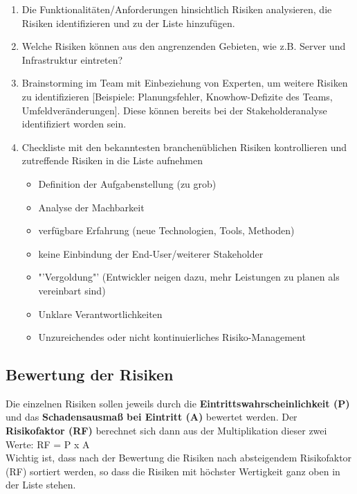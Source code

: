 \documentclass[
	headings=optiontotocandhead,%
	oneside,
	numbers=noenddot,%
	toc=flat, %
	10pt, %
	parskip=full, %
	listof=totoc, %
	listof=flat, %
	numbers=noenddot, %
	bibliography=totoc, %
	a4paper,DIV=14,
]{scrartcl}
\begin{document}
\begin{enumerate}
	\item{Die Funktionalitäten/Anforderungen hinsichtlich Risiken analysieren, die Risiken identifizieren und zu der Liste hinzufügen.}
	\item{Welche Risiken können aus den angrenzenden Gebieten, wie z.B. Server und Infrastruktur eintreten?}
	\item{Brainstorming im Team mit Einbeziehung von Experten, um weitere Risiken zu identifizieren [Beispiele: Planungsfehler, Knowhow-Defizite des Teams, Umfeldveränderungen]. Diese können bereits bei der Stakeholderanalyse identifiziert worden sein.}
	\item{
		Checkliste mit den bekanntesten branchenüblichen Risiken kontrollieren und zutreffende Risiken in die Liste aufnehmen
		\begin{itemize}
			\item Definition der Aufgabenstellung (zu grob)
			\item Analyse der Machbarkeit
			\item verfügbare Erfahrung (neue Technologien, Tools, Methoden)
			\item keine Einbindung der End-User/weiterer Stakeholder
			\item "'Vergoldung"' (Entwickler neigen dazu, mehr Leistungen zu planen als vereinbart sind)
			\item Unklare Verantwortlichkeiten
			\item Unzureichendes oder nicht kontinuierliches Risiko-Management
		\end{itemize}
		}
\end{enumerate}

\subsection{Bewertung der Risiken}
Die einzelnen Risiken sollen jeweils durch die \textbf{Eintrittswahrscheinlichkeit (P)} und das \textbf{Schadensausmaß bei Eintritt (A)} bewertet werden. Der \textbf{Risikofaktor (RF)} berechnet sich dann aus der Multiplikation dieser zwei Werte: RF = P x A\\
Wichtig ist, dass nach der Bewertung die Risiken nach absteigendem Risikofaktor (RF) sortiert werden, so dass die Risiken mit höchster Wertigkeit ganz oben in der Liste stehen.
\end{document}

